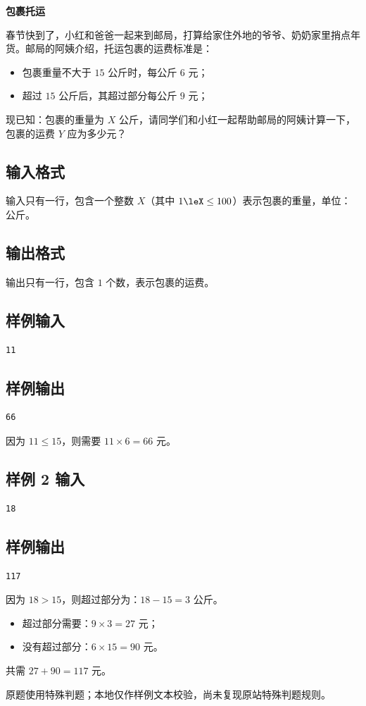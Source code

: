 \documentclass{article}
\newcommand{\problemname}[1]{\begin{center}\Large\bfseries #1\end{center}}
\begin{document}
\problemname{包裹托运}

春节快到了，小红和爸爸一起来到邮局，打算给家住外地的爷爷、奶奶家里捎点年货。邮局的阿姨介绍，托运包裹的运费标准是：

\begin{itemize}
  \item 包裹重量不大于 $15$ 公斤时，每公斤 $6$ 元；

  \item 超过 $15$ 公斤后，其超过部分每公斤 $9$ 元；

\end{itemize}
现已知：包裹的重量为 $X$ 公斤，请同学们和小红一起帮助邮局的阿姨计算一下，包裹的运费 $Y$ 应为多少元？

\subsection*{输入格式}
输入只有一行，包含一个整数 $X$（其中 $1\leX\le100$）表示包裹的重量，单位：公斤。

\subsection*{输出格式}
输出只有一行，包含 $1$ 个数，表示包裹的运费。

\subsection*{样例输入}
\begin{verbatim}
11
\end{verbatim}

\subsection*{样例输出}
\begin{verbatim}
66
\end{verbatim}

因为 $11\le15$，则需要 $11\times6=66$ 元。

\subsection*{样例 2 输入}
\begin{verbatim}
18
\end{verbatim}

\subsection*{样例输出}
\begin{verbatim}
117
\end{verbatim}

因为 $18>15$，则超过部分为：$18-15=3$ 公斤。

\begin{itemize}
  \item 超过部分需要：$9\times3=27$ 元；

  \item 没有超过部分：$6\times15=90$ 元。

\end{itemize}
共需 $27+90=117$ 元。

原题使用特殊判题；本地仅作样例文本校验，尚未复现原站特殊判题规则。
\end{document}

